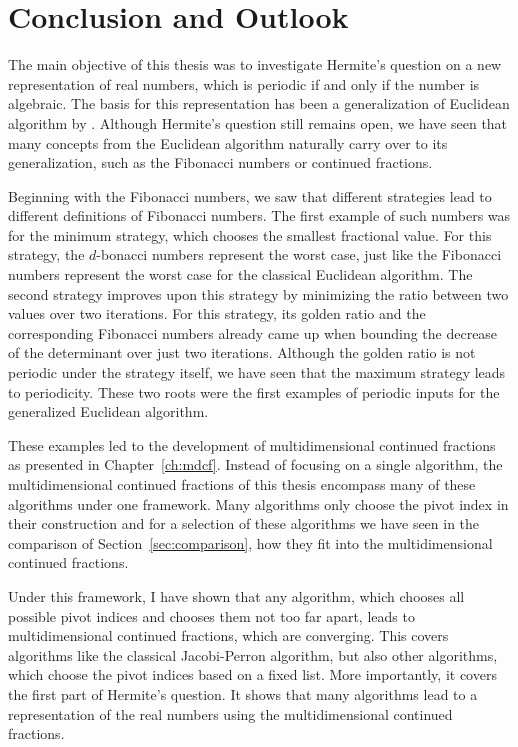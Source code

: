 \chapter{Conclusion and Outlook}
\label{ch:conclusion}

The main objective of this thesis
was to investigate Hermite's question
on a new representation of real numbers,
which is periodic if and only if the number is algebraic.
The basis for this representation has been a generalization of Euclidean
algorithm by \citeauthor{Klein24}.
Although Hermite's question still remains open,
we have seen that many concepts from the Euclidean algorithm naturally carry
over to its generalization, such as the Fibonacci numbers or continued
fractions.

Beginning with the Fibonacci numbers,
we saw that different strategies lead to different definitions of Fibonacci numbers.
The first example of such numbers was for the minimum strategy,
which chooses the smallest fractional value.
For this strategy, the $d$-bonacci numbers represent the worst case,
just like the Fibonacci numbers represent the worst case for the classical
Euclidean algorithm.
The second strategy improves upon this strategy by minimizing the ratio between two values over two iterations.
For this strategy, its golden ratio and the corresponding Fibonacci numbers
already came up when bounding the decrease of the determinant over just two iterations.
Although the golden ratio is not periodic under the strategy itself,
we have seen that the maximum strategy leads to periodicity.
These two roots were the first examples of periodic inputs for the generalized Euclidean algorithm.

These examples led to the development of multidimensional continued fractions
as presented in Chapter~\ref{ch:mdcf}.
Instead of focusing on a single algorithm,
the multidimensional continued fractions of this thesis encompass many of these
algorithms under one framework.
Many algorithms only choose the pivot index in their construction and for a
selection of these algorithms we have seen in the comparison of
Section~\ref{sec:comparison}, how they fit into the multidimensional
continued fractions.

Under this framework,
I have shown that any algorithm, which chooses all possible pivot indices and
chooses them not too far apart, leads to multidimensional continued fractions,
which are converging.
This covers algorithms like the classical Jacobi-Perron algorithm,
but also other algorithms, which choose the pivot indices based on a fixed list.
More importantly, it covers the first part of Hermite's question.
It shows that many algorithms lead to a representation of the real numbers
using the multidimensional continued fractions.

